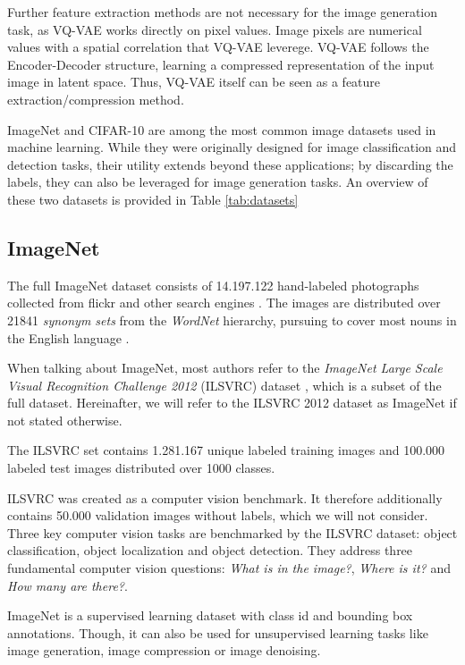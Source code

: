 \documentclass[10pt,a4paper,twoside]{article}
\begin{document}
    Further feature extraction methods are not necessary for the image generation task, as VQ-VAE works directly on pixel values. Image pixels are numerical values with a spatial correlation that VQ-VAE leverege. VQ-VAE follows the Encoder-Decoder structure, learning a compressed representation of the input image in latent space. Thus, VQ-VAE itself can be seen as a feature extraction/compression method.

    ImageNet and CIFAR-10 are among the most common image datasets used in machine learning. While they were originally designed for image classification and detection tasks, their utility extends beyond these applications; by discarding the labels, they can also be leveraged for image generation tasks. An overview of these two datasets is provided in Table \ref{tab:datasets}
    
    \subsection{ImageNet}
    The full ImageNet dataset consists of 14.197.122 hand-labeled photographs collected from flickr and other search engines \cite{ILSVRC15}\cite{imagenet_breakdown}. The images are distributed over 21841 \textit{synonym sets} from the \textit{WordNet} \cite{wordnet} hierarchy, pursuing to cover most nouns in the English language \cite{imagenet_breakdown}.

    When talking about ImageNet, most authors refer to the \textit{ImageNet Large Scale Visual Recognition Challenge 2012} (ILSVRC) dataset \cite{ILSVRC15}, which is a subset of the full dataset. Hereinafter, we will refer to the ILSVRC 2012 dataset as ImageNet if not stated otherwise.
    
    The ILSVRC set contains 1.281.167 unique labeled training images and 100.000 labeled test images distributed over 1000 classes.
     
    ILSVRC was created as a computer vision benchmark. It therefore additionally contains 50.000 validation images without labels, which we will not consider.
    Three key computer vision tasks are benchmarked by the ILSVRC dataset: object classification, object localization and object detection.
    They address three fundamental computer vision questions: \textit{What is in the image?}, \textit{Where is it?} and \textit{How many are there?}.

    ImageNet is a supervised learning dataset with class id and bounding box annotations. Though, it can also be used for unsupervised learning tasks like image generation, image compression or image denoising.
    
\end{document}
